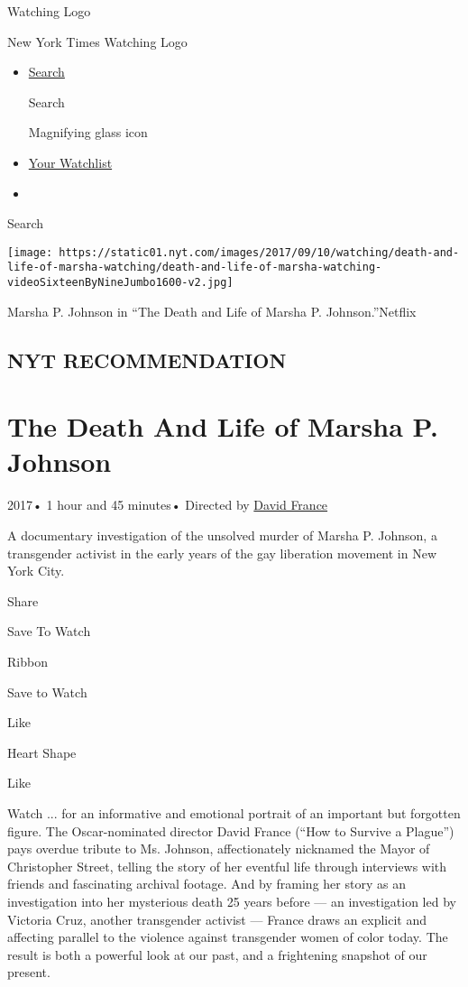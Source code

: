 \href{/watching}{}

Watching Logo

New York Times Watching Logo

\begin{itemize}
\item
  \href{/watching/search}{Search}

  Search

  Magnifying glass icon
\item
  \href{/watching/watchlist}{Your Watchlist}
\item
\end{itemize}

Search

\texttt{[image: https://static01.nyt.com/images/2017/09/10/watching/death-and-life-of-marsha-watching/death-and-life-of-marsha-watching-videoSixteenByNineJumbo1600-v2.jpg]}

Marsha P. Johnson in ``The Death and Life of Marsha P. Johnson.''Netflix

\hypertarget{nyt-recommendation}{%
\subsection{NYT RECOMMENDATION}\label{nyt-recommendation}}

\hypertarget{the-death-and-life-of-marsha-p-johnson}{%
\section{The Death And Life of Marsha P.
Johnson}\label{the-death-and-life-of-marsha-p-johnson}}

2017• 1 hour and 45 minutes• Directed by
\href{/watching/search?q=David\%20France\&director=david-france}{David
France}

A documentary investigation of the unsolved murder of Marsha P. Johnson,
a transgender activist in the early years of the gay liberation movement
in New York City.

Share

Save To Watch

Ribbon

Save to Watch

Like

Heart Shape

Like

Watch ... for an informative and emotional portrait of an important but
forgotten figure. The Oscar-nominated director David France (``How to
Survive a Plague'') pays overdue tribute to Ms. Johnson, affectionately
nicknamed the Mayor of Christopher Street, telling the story of her
eventful life through interviews with friends and fascinating archival
footage. And by framing her story as an investigation into her
mysterious death 25 years before --- an investigation led by Victoria
Cruz, another transgender activist --- France draws an explicit and
affecting parallel to the violence against transgender women of color
today. The result is both a powerful look at our past, and a frightening
snapshot of our present.

